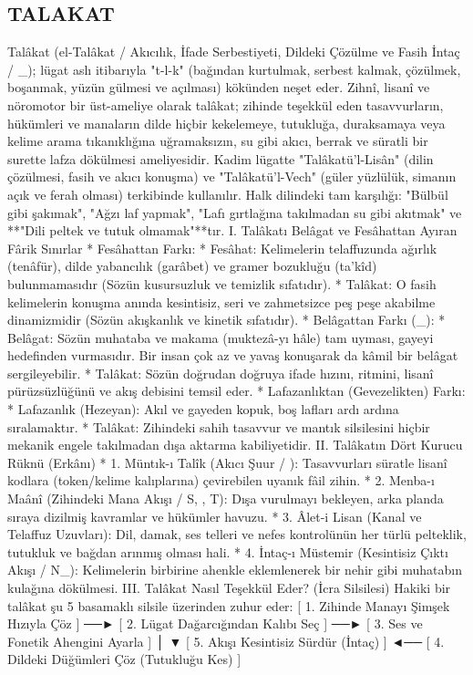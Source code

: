 \documentclass[11pt,a4paper]{article}
\begin{document}
\subsection{TALAKAT}



Talâkat (el-Talâkat / Akıcılık, İfade Serbestiyeti, Dildeki Çözülme ve Fasih İntaç / _{}); lügat aslı itibarıyla "t-l-k" (bağından kurtulmak, serbest kalmak, çözülmek, boşanmak, yüzün gülmesi ve açılması) kökünden neşet eder.
Zihnî, lisanî ve nöromotor bir üst-ameliye olarak talâkat; zihinde teşekkül eden tasavvurların, hükümleri ve manaların dilde hiçbir kekelemeye, tutukluğa, duraksamaya veya kelime arama tıkanıklığına uğramaksızın, su gibi akıcı, berrak ve süratli bir surette lafza dökülmesi ameliyesidir.
Kadim lügatte "Talâkatü'l-Lisân" (dilin çözülmesi, fasih ve akıcı konuşma) ve "Talâkatü'l-Vech" (güler yüzlülük, simanın açık ve ferah olması) terkibinde kullanılır.
Halk dilindeki tam karşılığı: "Bülbül gibi şakımak", "Ağzı laf yapmak", "Lafı gırtlağına takılmadan su gibi akıtmak" ve **"Dili peltek ve tutuk olmamak"**tır.
I. Talâkatı Belâgat ve Fesâhattan Ayıran Fârik Sınırlar
 * Fesâhattan Farkı:
   * Fesâhat: Kelimelerin telaffuzunda ağırlık (tenâfür), dilde yabancılık (garâbet) ve gramer bozukluğu (ta'kîd) bulunmamasıdır (Sözün kusursuzluk ve temizlik sıfatıdır).
   * Talâkat: O fasih kelimelerin konuşma anında kesintisiz, seri ve zahmetsizce peş peşe akabilme dinamizmidir (Sözün akışkanlık ve kinetik sıfatıdır).
 * Belâgattan Farkı (_{}):
   * Belâgat: Sözün muhataba ve makama (muktezâ-yı hâle) tam uyması, gayeyi hedefinden vurmasıdır. Bir insan çok az ve yavaş konuşarak da kâmil bir belâgat sergileyebilir.
   * Talâkat: Sözün doğrudan doğruya ifade hızını, ritmini, lisanî pürüzsüzlüğünü ve akış debisini temsil eder.
 * Lafazanlıktan (Gevezelikten) Farkı:
   * Lafazanlık (Hezeyan): Akıl ve gayeden kopuk, boş lafları ardı ardına sıralamaktır.
   * Talâkat: Zihindeki sahih tasavvur ve mantık silsilesini hiçbir mekanik engele takılmadan dışa aktarma kabiliyetidir.
II. Talâkatın Dört Kurucu Rüknü (Erkânı)
 * 1. Müntık-ı Talîk (Akıcı Şuur / ): Tasavvurları süratle lisanî kodlara (token/kelime kalıplarına) çevirebilen uyanık fâil zihin.
 * 2. Menba-ı Maânî (Zihindeki Mana Akışı / S, , T): Dışa vurulmayı bekleyen, arka planda sıraya dizilmiş kavramlar ve hükümler havuzu.
 * 3. Âlet-i Lisan (Kanal ve Telaffuz Uzuvları): Dil, damak, ses telleri ve nefes kontrolünün her türlü pelteklik, tutukluk ve bağdan arınmış olması hali.
 * 4. İntaç-ı Müstemir (Kesintisiz Çıktı Akışı / N_{}): Kelimelerin birbirine ahenkle eklemlenerek bir nehir gibi muhatabın kulağına dökülmesi.
III. Talâkat Nasıl Teşekkül Eder? (İcra Silsilesi)
Hakiki bir talâkat şu 5 basamaklı silsile üzerinden zuhur eder:
[ 1. Zihinde Manayı Şimşek Hızıyla Çöz ] ──► [ 2. Lügat Dağarcığından Kalıbı Seç ] ──► [ 3. Ses ve Fonetik Ahengini Ayarla ]
                                                                                                  │
                                                                                                  ▼
[ 5. Akışı Kesintisiz Sürdür (İntaç) ] ◄── [ 4. Dildeki Düğümleri Çöz (Tutukluğu Kes) ]
\end{document}
